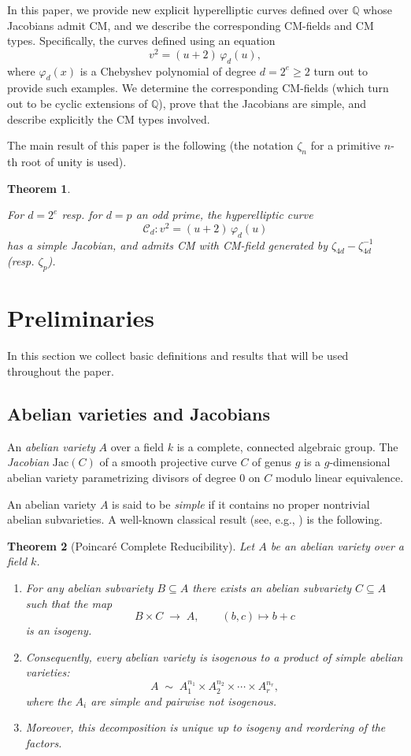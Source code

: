 \documentclass[a4paper,12pt]{amsart}
\newcommand{\QQ}{{\mathbb Q}}
\def\cC{{\mathcal C}}
\numberwithin{equation}{section}
\theoremstyle{plain}
\newtheorem{thm}{Theorem}
\numberwithin{thm}{section}
\begin{document}
In this paper, we provide new explicit hyperelliptic curves 
defined over $\QQ$ whose Jacobians admit CM, and we
describe the corresponding CM-fields and CM types. Specifically, the curves defined using an equation
\[
v^2 = (u+2)\,\varphi_d(u),
\]
where $\varphi_d(x)$ is a Chebyshev polynomial of degree $d=2^e\geq 2$ turn out to provide such examples. 
We determine the corresponding CM-fields (which turn out to be
cyclic extensions of $\QQ$), prove that the Jacobians are 
simple, and describe explicitly the CM types involved. 

The main result of this paper is the following (the notation
$\zeta_n$ for a primitive $n$-th root of unity is used).


\begin{thm}\label{mainthm}

For $d=2^e$ resp. for $d=p$ an odd prime, the hyperelliptic curve
\[
\cC_d\colon v^2 = (u+2)\,\varphi_d(u)
\]
has a simple Jacobian, and admits CM with CM-field  generated by $\zeta_{4d} - \zeta_{4d}^{-1}$ (resp. $\zeta_p$). 
\end{thm}


\section{Preliminaries}

In this section we collect basic definitions and results that will be used throughout the paper.  

\subsection{Abelian varieties and Jacobians}

An \emph{abelian variety} $A$ over a field $k$ is a complete, connected algebraic group. The \emph{Jacobian} $\textrm{Jac}(C)$ of a smooth projective curve $C$ of genus $g$ is a $g$-dimensional abelian variety parametrizing divisors of degree $0$ on $C$ modulo linear equivalence.

An abelian variety $A$ is said to be \emph{simple} if it contains no proper nontrivial abelian subvarieties. 
A well-known classical result (see, e.g., \cite[\S12]{CorSil})
is the following.

\begin{thm}[Poincar\'e Complete Reducibility]
Let $A$ be an abelian variety over a field $k$. 
\begin{enumerate}
    \item For any abelian subvariety $B \subseteq A$ there exists an abelian subvariety 
    $C \subseteq A$ such that the map
    \[
    B \times C \;\longrightarrow\; A, \qquad (b,c) \mapsto b+c
    \]
    is an isogeny.
    \item Consequently, every abelian variety is isogenous to a product of simple 
    abelian varieties:
    \[
    A \;\sim\; A_1^{n_1} \times A_2^{n_2} \times \cdots \times A_r^{n_r},
    \]
    where the $A_i$ are simple and pairwise not isogenous.
    \item Moreover, this decomposition is unique up to isogeny and reordering 
    of the factors.
\end{enumerate}
\end{thm}
\end{document}
